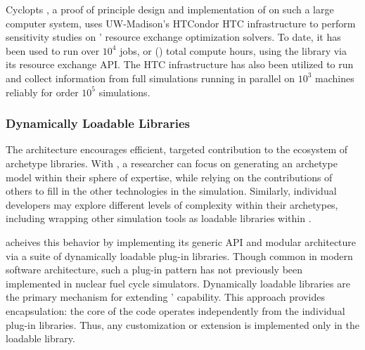 Cyclopts \cite{gidden_cyclopts_2015}, a proof of principle design and
implementation of \Cyclus on such a large computer system, uses UW-Madison's
HTCondor \gls{HTC} infrastructure to perform sensitivity studies on \Cyclus'
resource exchange optimization solvers. To date, it has been used to run over
$10^4$ jobs, or () total compute hours, using the \Cyclus
library via its resource exchange \gls{API}.  The \gls{HTC} infrastructure has
also been utilized to run and collect information from full \Cyclus simulations
running in parallel on $10^3$ machines reliably for order $10^5$ simulations.

\subsubsection{Dynamically Loadable Libraries}

The \Cyclus architecture encourages efficient, targeted contribution to the ecosystem of 
archetype libraries.
With \Cyclus, a researcher can focus on generating an archetype model within their
sphere of expertise, while relying on the contributions of others to fill 
in the other technologies in the simulation.  
Similarly, individual developers may explore different levels of complexity within their archetypes, including
wrapping other simulation tools as loadable libraries within \Cyclus.

\Cyclus acheives this behavior by implementing its generic \gls{API} and 
modular architecture via a suite of dynamically loadable plug-in libraries.  
Though common in modern software architecture, such a plug-in pattern has not 
previously been implemented in nuclear fuel cycle simulators.  Dynamically 
loadable libraries are the primary mechanism for extending \Cyclus' capability. 
This approach provides encapsulation: the core of the code operates 
independently from the individual plug-in libraries. Thus, any customization or 
extension is implemented only in the loadable library.  

